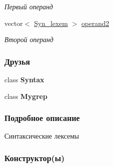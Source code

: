 \begin{DoxyCompactItemize}
\begin{DoxyCompactList}\small\item\em Первый операнд \end{DoxyCompactList}\item 
\hypertarget{class_syn__lexem_a2785b2c17862062c1b0413f6fd8a5dbd}{}vector$<$ \hyperlink{class_syn__lexem}{Syn\+\_\+lexem} $>$ \hyperlink{class_syn__lexem_a2785b2c17862062c1b0413f6fd8a5dbd}{operand2}\label{class_syn__lexem_a2785b2c17862062c1b0413f6fd8a5dbd}

\begin{DoxyCompactList}\small\item\em Второй операнд \end{DoxyCompactList}\end{DoxyCompactItemize}
\subsubsection*{Друзья}
\begin{DoxyCompactItemize}
\item 
\hypertarget{class_syn__lexem_a13fb68a36cac69480f7fd4b3900594f9}{}class {\bfseries Syntax}\label{class_syn__lexem_a13fb68a36cac69480f7fd4b3900594f9}

\item 
\hypertarget{class_syn__lexem_a90fdb1ff12233c504810e346b5f6e49f}{}class {\bfseries Mygrep}\label{class_syn__lexem_a90fdb1ff12233c504810e346b5f6e49f}

\end{DoxyCompactItemize}


\subsubsection{Подробное описание}
Синтаксические лексемы 

\subsubsection{Конструктор(ы)}
\hypertarget{class_syn__lexem_a41cbc6daa60c91a689593635f4ab7e68}{}
